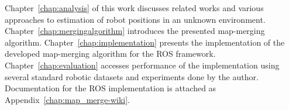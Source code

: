 Chapter~\ref{chap:analysis} of this work discusses related works and various approaches to estimation of robot positions in an unknown environment. Chapter~\ref{chap:mergingalgorithm} introduces the presented map-merging algorithm. Chapter~\ref{chap:implementation} presents the implementation of the developed map-merging algorithm for the \gls{ROS} framework. Chapter~\ref{chap:evaluation} accesses performance of the implementation using several standard robotic datasets and experiments done by the author. Documentation for the \gls{ROS} implementation is attached as Appendix~\ref{chap:map_merge-wiki}.
